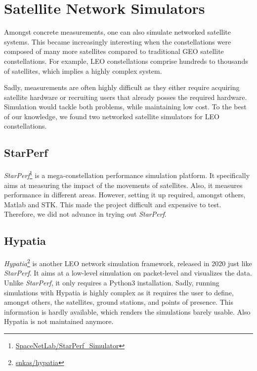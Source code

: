 \section{Satellite Network Simulators} \label{sec:satellite_network_simulators}

Amongst concrete measurements, one can also simulate networked satellite
systems. This became increasingly interesting when the constellations were
composed of many more satellites compared to traditional \ac{GEO} satellite
constellations. For example, \ac{LEO} constellations comprise hundreds to
thousands of satellites, which implies a highly complex system.

Sadly, measurements are often highly difficult as they either require acquiring
satellite hardware or recruiting users that already posses the required
hardware. Simulation would tackle both problems, while maintaining low cost. To
the best of our knowledge, we found two networked satellite simulators for
\ac{LEO} constellations.

\subsection{StarPerf} \label{sec:starperf}

\textit{StarPerf}\footnote{\href{https://github.com/SpaceNetLab/StarPerf\_Simulator}{SpaceNetLab/StarPerf\_Simulator}}
\cite{DBLP:conf/icnp/LaiLL20} is a mega-constellation performance simulation
platform. It specifically aims at measuring the impact of the movements of
satellites. Also, it measures performance in different areas. However, setting
it up required, amongst others, Matlab and STK. This made the project difficult
and expensive to test. Therefore, we did not advance in trying out
\textit{StarPerf}.

\subsection{Hypatia} \label{sec:hypatia}

\textit{Hypatia}\footnote{\href{https://github.com/snkas/hypatia}{snkas/hypatia}}
\cite{DBLP:conf/imc/KassingBASS20} is another LEO network simulation framework,
released in 2020 just like \textit{StarPerf}. It aims at a low-level simulation
on packet-level and visualizes the data. Unlike \textit{StarPerf}, it only
requires a Python3 installation. Sadly, running simulations with Hypatia is
highly complex as it requires the user to define, amongst others, the
satellites, ground stations, and points of presence. This information is hardly
available, which renders the simulations barely usable. Also Hypatia is not
maintained anymore.

